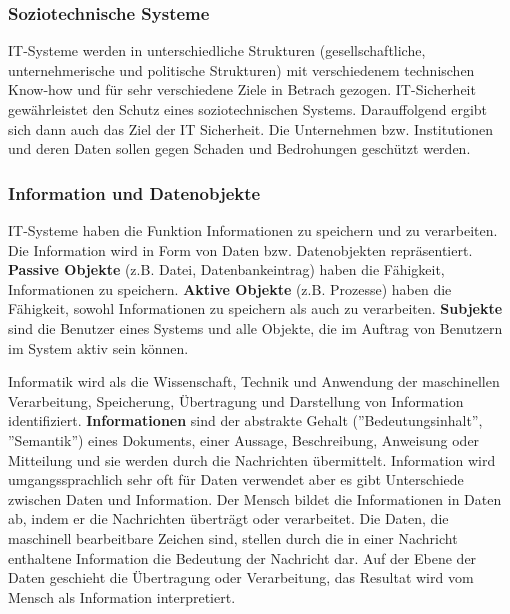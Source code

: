 \subsubsection{Soziotechnische Systeme}

IT-Systeme werden in unterschiedliche Strukturen (gesellschaftliche, unternehmerische und politische Strukturen) mit verschiedenem technischen Know-how und für sehr verschiedene Ziele in Betrach gezogen\cite[23]{eckert2013sicherheit}. IT-Sicherheit gewährleistet den Schutz eines soziotechnischen Systems. Darauffolgend ergibt sich dann auch das Ziel der IT Sicherheit. Die Unternehmen bzw. Institutionen und deren Daten sollen gegen Schaden und Bedrohungen geschützt werden\cite{so18tech}. 

\subsubsection{Information und Datenobjekte}

IT-Systeme haben die Funktion Informationen zu speichern und zu verarbeiten. Die Information wird in Form von Daten bzw. Datenobjekten repräsentiert. \textbf{Passive Objekte} (z.B. Datei, Datenbankeintrag) haben die Fähigkeit, Informationen zu speichern. \textbf{Aktive Objekte} (z.B. Prozesse) haben die Fähigkeit, sowohl Informationen zu speichern als auch zu verarbeiten\cite[23]{eckert2013sicherheit}.  \textbf{Subjekte} sind die Benutzer eines Systems und alle Objekte, die im Auftrag von Benutzern im System aktiv sein können\cite[24]{eckert2013sicherheit}. 

Informatik wird als die Wissenschaft, Technik und Anwendung der maschinellen Verarbeitung, Speicherung, Übertragung und Darstellung von Information identifiziert. \textbf{Informationen} sind der abstrakte Gehalt (''Bedeutungsinhalt'', ''Semantik'') eines Dokuments, einer Aussage, Beschreibung, Anweisung oder Mitteilung\cite[5]{broy2013informatik} und sie werden durch die Nachrichten übermittelt\cite[18]{blieberger2013informatik}. Information wird umgangssprachlich sehr oft für Daten verwendet aber es gibt Unterschiede zwischen Daten und Information. Der Mensch bildet die Informationen in Daten ab, indem er die Nachrichten überträgt oder verarbeitet. Die Daten, die maschinell bearbeitbare Zeichen sind, stellen durch die in einer Nachricht enthaltene Information die Bedeutung der Nachricht dar. Auf der Ebene der Daten geschieht die Übertragung oder Verarbeitung, das Resultat wird vom Mensch als Information interpretiert\cite{infstd}.

